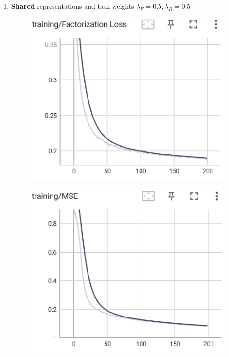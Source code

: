 \documentclass[12pt]{article}
\begin{document}
\begin{enumerate}
    \item \textbf{Shared} representations and task weights $\lambda_F=0.5, \lambda_R=0.5$

    \begin{figure}[htbp]
	\centering
	\begin{minipage}{0.4\linewidth}
		\centering
		\includegraphics[width=0.9\linewidth]{./figs/shared_factorization_loss_50_50.png}
		\label{pic one}%
	\end{minipage}
	\begin{minipage}{0.4\linewidth}
		\centering
		\includegraphics[width=0.9\linewidth]{./figs/shared_mse_50_50.png}
		\label{pic two}%
	\end{minipage}

\end{figure}
\end{enumerate}
\end{document}
